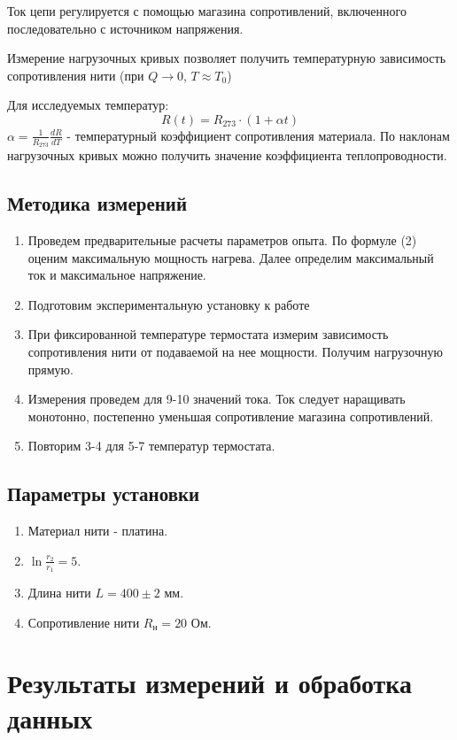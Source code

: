 \documentclass[a4paper,12pt]{article}
\begin{document}
Ток цепи регулируется с помощью магазина сопротивлений, включенного последовательно с источником напряжения.

Измерение нагрузочных кривых позволяет получить температурную зависимость сопротивления нити (при $Q \to 0$, $T\approx T_0$)

Для исследуемых температур:
\begin{equation}
R(t)=R_{273}\cdot(1+\alpha t)
\end{equation}
$\alpha=\frac{1}{R_{273}}\frac{dR}{dT}$  - температурный коэффициент сопротивления материала. По наклонам нагрузочных кривых можно получить значение коэффициента теплопроводности.

\subsection*{Методика измерений}
\begin{enumerate}
    \item Проведем предварительные расчеты параметров опыта. По формуле (2) оценим максимальную мощность нагрева. Далее определим максимальный ток и максимальное напряжение.
    \item Подготовим экспериментальную установку к работе 
    \item При фиксированной температуре термостата измерим зависимость сопротивления нити от подаваемой на нее мощности. Получим нагрузочную прямую.
    \item Измерения проведем для 9-10 значений тока. Ток следует наращивать монотонно, постепенно уменьшая сопротивление магазина сопротивлений. 
    \item Повторим 3-4 для 5-7 температур термостата. 
\end{enumerate}

\subsection*{Параметры установки}
\begin{enumerate}
    \item Материал нити - платина.
    \item $\ln \frac{r_2}{r_1} = 5$.
    \item Длина нити $L = 400 \pm 2$ мм.
    \item Сопротивление нити $R_н = 20$ Ом.
\end{enumerate}

\section{Результаты измерений и обработка данных}
\end{document}
